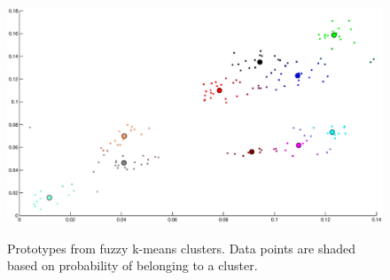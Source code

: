 \begin{figure}
\includegraphics[width=\textwidth]{images/fuzzy-gradient}
\label{fig:k-means-gradientfuzz}
\caption{Prototypes from fuzzy k-means clusters. Data points are
shaded based on probability of belonging to a cluster.}
\end{figure}
